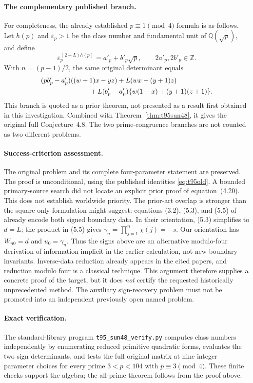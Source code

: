 \documentclass[11pt,a4paper]{article}
\theoremstyle{definition}
\theoremstyle{remark}
\begin{document}
\paragraph{The complementary published branch.}
For completeness, the already established $p\equiv1\pmod4$ formula
\cite[Theorem~1.1]{t95yang2026} is as follows. Let $h(p)$ and
$\varepsilon_p>1$ be the class number and fundamental unit of
$\mathbb Q(\sqrt p)$, and define
\[
 \varepsilon_p^{(2-L)h(p)}=a'_p+b'_p\sqrt p,
 \qquad 2a'_p,2b'_p\in\mathbb Z.
\]
With $n=(p-1)/2$, the same original determinant equals
\begin{align*}
 &(pb'_p-a'_p)((w+1)x-yz)+L(wx-(y+1)z)\\
 &\hspace{25mm}+L(b'_p-a'_p)\{w(1-x)+(y+1)(z+1)\}.
\end{align*}
This branch is quoted as a prior theorem, not presented as a result first
obtained in this investigation. Combined with
Theorem~\ref{thm:t95sun48}, it gives the original full Conjecture~4.8.
The two prime-congruence branches are not counted as two different problems.

\paragraph{Success-criterion assessment.}
The original problem and its complete four-parameter statement are
preserved. The proof is unconditional, using the published identities
\eqref{eq:t95old}. A bounded primary-source search did not locate an
explicit prior proof of equation~(4.20). This does not establish worldwide
priority. The prior-art overlap is stronger than the square-only formulation
might suggest: equations (3.2), (5.3), and (5.5) of
\cite{t95yyy2026} already encode both signed boundary data. In their
orientation, (5.3) simplifies to $d=L$; the product in (5.5) gives
$\gamma_n=\prod_{j=1}^n\chi(j)=-s$. Our orientation has
$W_{n0}=d$ and $u_0=\gamma_n$. Thus the signs above are an alternative
modulo-four derivation of information implicit in the earlier calculation,
not new boundary invariants. Inverse-data reduction already appears in
the cited papers, and reduction modulo four is a classical technique.
This argument therefore supplies a concrete proof of the target, but it does
\emph{not} certify the requested historically unprecedented method.
The auxiliary sign-recovery problem must not be promoted into an
independent previously open named problem.

\paragraph{Exact verification.}
The standard-library program \texttt{t95\_sun48\_verify.py} computes
class numbers independently by enumerating reduced primitive quadratic
forms, evaluates the two sign determinants, and tests the full original
matrix at nine integer parameter choices for every prime
$3<p<104$ with $p\equiv3\pmod4$. These finite checks support the
algebra; the all-prime theorem follows from the proof above.
\end{document}
